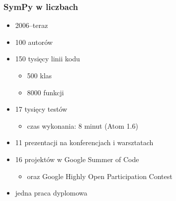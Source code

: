 \documentclass[10pt]{beamer}
\begin{document}
\begin{frame}[fragile]
    \frametitle{SymPy w liczbach}

    \begin{itemize}
        \item 2006--teraz
        \pause
        \item 100 autorów
        \item 150 tysięcy linii kodu
            \begin{itemize}
                \item 500 klas
                \item 8000 funkcji
            \end{itemize}
        \item 17 tysięcy testów
            \begin{itemize}
                \item czas wykonania: 8 minut (Atom 1.6)
            \end{itemize}
        \pause
        \item 11 prezentacji na konferencjach i warsztatach
        \item 16 projektów w Google Summer of Code
            \begin{itemize}
                \item oraz Google Highly Open Participation Contest
            \end{itemize}
        \item jedna praca dyplomowa
    \end{itemize}
\end{frame}
\end{document}
